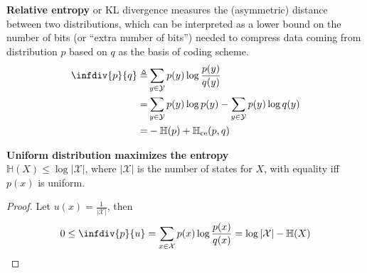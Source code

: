 \textbf{Relative entropy} or KL divergence measures the (asymmetric) distance between two distributions, which can be interpreted as a lower bound on the number of bits (or ``extra number of bits'') needed to compress data coming from distribution $p$ based on $q$ as the basis of coding scheme.
\begin{align}
    \infdiv{p}{q}
    \triangleq& \sum_{y\in\mathcal{Y}}p(y)\log\frac{p(y)}{q(y)}\\
    =& \sum_{y\in\mathcal{Y}}p(y)\log{p(y)} -\sum_{y\in\mathcal{Y}}p(y)\log{q(y)} \\
    =& -\mathbb{H}(p) + \mathbb{H}_\text{ce}(p,q)
\end{align}

\begin{corollary}
    \textbf{Uniform distribution maximizes the entropy}\\
    $\mathbb{H}(X)\leq\log{|\mathcal{X}|}$, where $|\mathcal{X}|$ is the number of states for $X$, with equality iff $p(x)$ is uniform.
\end{corollary}
\begin{proof}
    Let $u(x)=\frac{1}{|\mathcal{X}|}$, then
    \begin{gather}
        0\leq\infdiv{p}{u}=\sum_{x\in\mathcal{X}}p(x)\log{\frac{p(x)}{q(x)}}=\log{|\mathcal{X}|-\mathbb{H}(X)}
    \end{gather}
\end{proof}

